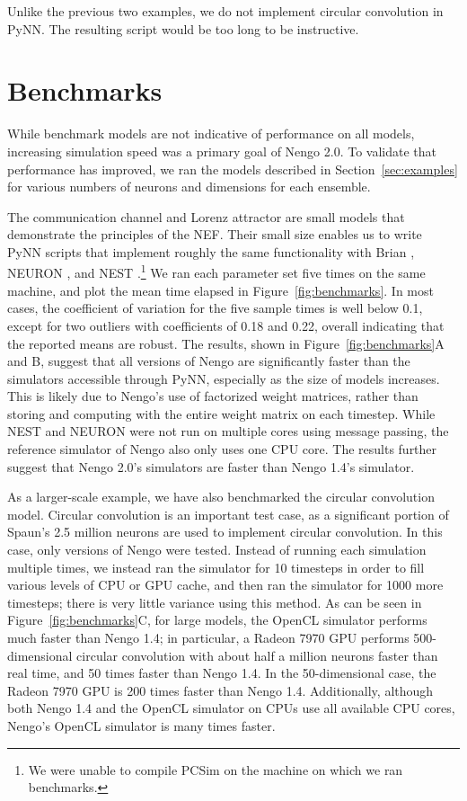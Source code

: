 \documentclass{frontiersSCNS}
\begin{document}
Unlike the previous two examples,
we do not implement
circular convolution in PyNN.
The resulting script would be
too long to be instructive.

\section{Benchmarks} \label{sec:benchmark}

While benchmark models are not indicative
of performance on all models,
increasing simulation speed
was a primary goal of Nengo 2.0.
To validate that performance has improved,
we ran the models described in Section~\ref{sec:examples}
for various numbers of neurons and dimensions
for each ensemble.

The communication channel and Lorenz attractor
are small models that demonstrate
the principles of the NEF.
Their small size enables us to write
PyNN scripts that implement roughly
the same functionality
with Brian \citep{goodman2008}, NEURON \citep{hines2009},
and NEST \citep{eppler2009}.\footnote{We
  were unable to compile PCSim \citep{pecevski2009} on the
  machine on which we ran benchmarks.}
We ran each parameter set five times
on the same machine,
and plot the mean time elapsed
in Figure~\ref{fig:benchmarks}.
In most cases, the coefficient of variation
for the five sample times
is well below 0.1, except for two
outliers with coefficients of 0.18 and 0.22,
overall indicating that the reported means are robust.
The results, shown in Figure~\ref{fig:benchmarks}A and B,
suggest that all versions of Nengo are significantly
faster than the simulators accessible
through PyNN, especially
as the size of models increases.
This is likely due to Nengo's
use of factorized weight matrices,
rather than storing and computing with
the entire weight matrix
on each timestep.
While NEST and NEURON were not
run on multiple cores using message passing,
the reference simulator of Nengo
also only uses one CPU core.
The results further suggest that Nengo 2.0's
simulators are faster than Nengo 1.4's simulator.

As a larger-scale example,
we have also benchmarked
the circular convolution model.
Circular convolution is an important test case,
as a significant portion of Spaun's
2.5 million neurons are used to
implement circular convolution.
In this case, only versions of Nengo were tested.
Instead of running each simulation multiple times,
we instead ran the simulator for 10 timesteps
in order to fill various levels of CPU or GPU cache,
and then ran the simulator for 1000 more timesteps;
there is very little variance using this method.
As can be seen in Figure~\ref{fig:benchmarks}C,
for large models, the OpenCL simulator
performs much faster than Nengo 1.4;
in particular, a Radeon 7970 GPU performs
500-dimensional circular convolution
with about half a million neurons
faster than real time,
and 50 times faster than Nengo 1.4.
In the 50-dimensional case,
the Radeon 7970 GPU is 200 times faster
than Nengo 1.4.
Additionally, although both Nengo 1.4
and the OpenCL simulator on CPUs
use all available CPU cores,
Nengo's OpenCL simulator is many times faster.
\end{document}
